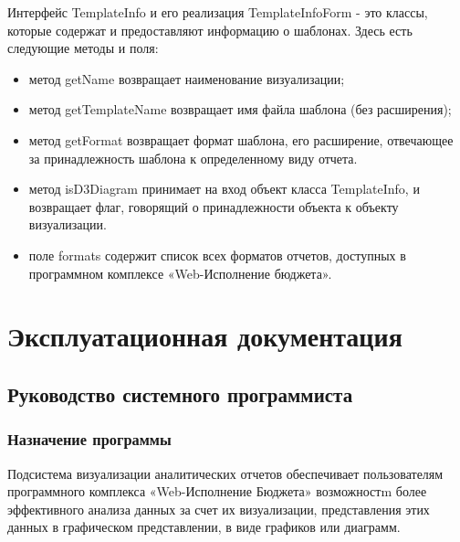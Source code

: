 \documentclass[a4paper]{extarticle}
\begin{document}
Интерфейс TemplateInfo и его реализация TemplateInfoForm - это классы, которые содержат и предоставляют информацию о шаблонах. Здесь есть следующие методы и поля:
\begin{itemize}
\item метод getName возвращает наименование визуализации;
\item метод getTemplateName возвращает имя файла шаблона (без расширения);
\item метод getFormat возвращает формат шаблона, его расширение, отвечающее за принадлежность шаблона к определенному виду отчета.
\item метод isD3Diagram принимает на вход объект класса TemplateInfo, и возвращает флаг, говорящий о принадлежности объекта к объекту визуализации.
\item поле formats содержит список всех форматов отчетов, доступных в программном комплексе «Web-Исполнение бюджета».
\end{itemize}

\section{Эксплуатационная документация}

\subsection{Руководство системного программиста}

\subsubsection{Назначение программы}
Подсистема визуализации аналитических отчетов обеспечивает пользователям программного комплекса «Web-Исполнение Бюджета» возможностm более эффективного анализа данных за счет их визуализации, представления этих данных в графическом представлении, в виде графиков или диаграмм.
\end{document}
